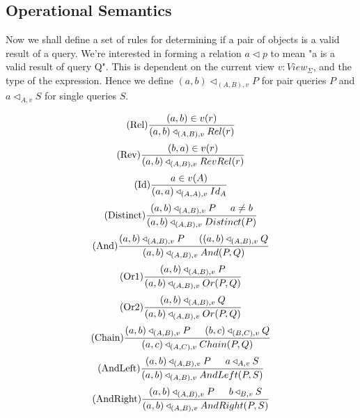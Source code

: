 \documentclass[twoside,a4paper,11pt]{article}
\newcommand{\opRule}[3]{#1 \triangleleft_{#2, v} #3}
\begin{document}
\subsection{Operational Semantics}

Now we shall define a set of rules for determining if a pair of objects is a valid result of a query. We're interested in forming a relation $a \triangleleft p$ to mean "a is a valid result of query Q". This is dependent on the current view $v: View_{\Sigma}$, and the type of the expression. Hence we define $\opRule{(a, b)}{(A, B)}{P}$ for pair queries $P$ and $\opRule{a}{A}{S}$ for single queries $S$.

\[ \begin{array}{c}
\displaystyle\mbox{(Rel)}\frac{(a,b) \in v(r)}{\opRule{(a, b)}{(A, B)}{Rel(r)}} \\[3ex]

\displaystyle\mbox{(Rev)}\frac{(b,a) \in v(r)}{\opRule{(a, b)}{(A, B)}{RevRel(r)}} \\[3ex]

\displaystyle\mbox{(Id)}\frac{a \in v(A)}{\opRule{(a, a)} {(A, A)} {Id_A}} \\[3ex]

\displaystyle\mbox{(Distinct)}\frac{\opRule{(a,b)}{(A, B)}{P} \indent a \neq b}{\opRule{(a,b)}{(A, B)}{Distinct(P)}} \\[3ex]

\displaystyle\mbox{(And)}\frac{\opRule{(a,b)}{(A, B)}{P} \indent (\opRule{(a,b)}{(A, B)}{Q}}{\opRule{(a,b)}{(A, B)}{And(P, Q)}} \\[3ex]

\displaystyle\mbox{(Or1)}\frac{\opRule{(a,b)}{(A, B)}{P}}{\opRule{(a,b)}{(A, B)}{Or(P, Q)}} \\[3ex]

\displaystyle\mbox{(Or2)}\frac{\opRule{(a,b)}{(A, B)}{Q}}{\opRule{(a,b)}{(A, B)}{Or(P, Q)}} \\[3ex]

\displaystyle\mbox{(Chain)}\frac{\opRule{(a,b)}{(A, B)}{P} \indent \opRule{(b,c)}{(B, C)}{Q}}{\opRule{(a,c)}{(A, C)}{Chain(P, Q)}} \\[3ex]

\displaystyle\mbox{(AndLeft)}\frac{\opRule{(a,b)}{(A, B)}{P} \indent \opRule{a}{A}{S}}{\opRule{(a,b)}{(A, B)}{AndLeft(P, S)}} \\[3ex]

\displaystyle\mbox{(AndRight)}\frac{\opRule{(a,b)}{(A, B)}{P} \indent \opRule{b}{
B}{S}}{\opRule{(a,b)}{(A, B)}{AndRight(P, S)}} \\[3ex]


\end{array}\]
\end{document}
